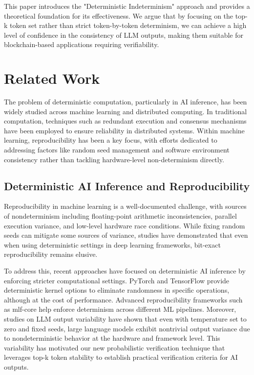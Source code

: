 \documentclass{article}
\begin{document}
This paper introduces the "Deterministic Indeterminism" approach and provides a theoretical foundation for its effectiveness.  We argue that by focusing on the top-k token set rather than strict token-by-token determinism, we can achieve a high level of confidence in the consistency of LLM outputs, making them suitable for blockchain-based applications requiring verifiability.

\section{Related Work}

The problem of deterministic computation, particularly in AI inference, has been widely studied across machine learning and distributed computing. In traditional computation, techniques such as redundant execution and consensus mechanisms have been employed to ensure reliability in distributed systems. Within machine learning, reproducibility has been a key focus, with efforts dedicated to addressing factors like random seed management and software environment consistency rather than tackling hardware-level non-determinism directly.

\subsection{Deterministic AI Inference and Reproducibility}

Reproducibility in machine learning is a well-documented challenge, with sources of nondeterminism including floating-point arithmetic inconsistencies, parallel execution variance, and low-level hardware race conditions. While fixing random seeds can mitigate some sources of variance, studies have demonstrated that even when using deterministic settings in deep learning frameworks, bit-exact reproducibility remains elusive.

To address this, recent approaches have focused on deterministic AI inference by enforcing stricter computational settings. PyTorch and TensorFlow provide deterministic kernel options to eliminate randomness in specific operations, although at the cost of performance. Advanced reproducibility frameworks such as mlf-core help enforce determinism across different ML pipelines. Moreover, studies on LLM output variability have shown that even with temperature set to zero and fixed seeds, large language models exhibit nontrivial output variance due to nondeterministic behavior at the hardware and framework level. This variability has motivated our new probabilistic verification technique that leverages top-k token stability to establish practical verification criteria for AI outputs.
\end{document}
